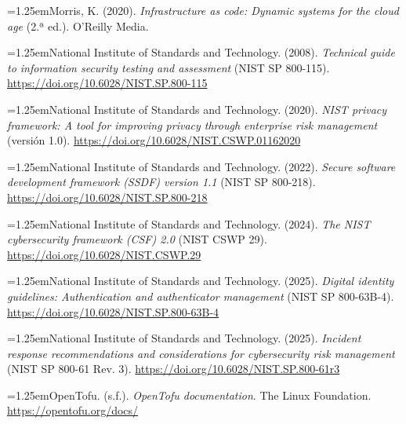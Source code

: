 \documentclass[11pt,a4paper]{article}
\newenvironment{hangparas}{\par\hangindent=1.25em\hangafter=1\noindent}{\par}
\begin{document}
\begin{hangparas}Morris, K. (2020). \textit{Infrastructure as code: Dynamic systems for the cloud age} (2.ª ed.). O'Reilly Media.\end{hangparas}

\begin{hangparas}National Institute of Standards and Technology. (2008). \textit{Technical guide to information security testing and assessment} (NIST SP 800-115). \url{https://doi.org/10.6028/NIST.SP.800-115}\end{hangparas}

\begin{hangparas}National Institute of Standards and Technology. (2020). \textit{NIST privacy framework: A tool for improving privacy through enterprise risk management} (versión 1.0). \url{https://doi.org/10.6028/NIST.CSWP.01162020}\end{hangparas}

\begin{hangparas}National Institute of Standards and Technology. (2022). \textit{Secure software development framework (SSDF) version 1.1} (NIST SP 800-218). \url{https://doi.org/10.6028/NIST.SP.800-218}\end{hangparas}

\begin{hangparas}National Institute of Standards and Technology. (2024). \textit{The NIST cybersecurity framework (CSF) 2.0} (NIST CSWP 29). \url{https://doi.org/10.6028/NIST.CSWP.29}\end{hangparas}

\begin{hangparas}National Institute of Standards and Technology. (2025). \textit{Digital identity guidelines: Authentication and authenticator management} (NIST SP 800-63B-4). \url{https://doi.org/10.6028/NIST.SP.800-63B-4}\end{hangparas}

\begin{hangparas}National Institute of Standards and Technology. (2025). \textit{Incident response recommendations and considerations for cybersecurity risk management} (NIST SP 800-61 Rev. 3). \url{https://doi.org/10.6028/NIST.SP.800-61r3}\end{hangparas}

\begin{hangparas}OpenTofu. (s.f.). \textit{OpenTofu documentation}. The Linux Foundation. \url{https://opentofu.org/docs/}\end{hangparas}
\end{document}
